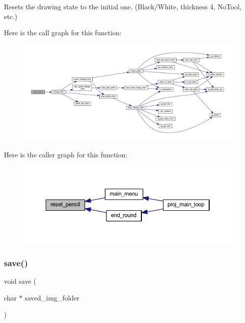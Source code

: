 Resets the drawing state to the initial one. (Black/\+White, thickness 4, No\+Tool, etc.) 

Here is the call graph for this function\+:\nopagebreak
\begin{figure}[H]
\begin{center}
\leavevmode
\includegraphics[width=350pt]{group__pengoo_ga30fa7d6f201a425bca137ab6a78e8c82_cgraph}
\end{center}
\end{figure}
Here is the caller graph for this function\+:\nopagebreak
\begin{figure}[H]
\begin{center}
\leavevmode
\includegraphics[width=350pt]{group__pengoo_ga30fa7d6f201a425bca137ab6a78e8c82_icgraph}
\end{center}
\end{figure}
\mbox{\label{group__pengoo_ga7be478ae067a8e77c79ece6af6082ce5}} 
\subsubsection{\texorpdfstring{save()}{save()}}
{\footnotesize\ttfamily void save (\begin{DoxyParamCaption}\item[{char $\ast$}]{saved\+\_\+img\+\_\+folder }\end{DoxyParamCaption})}



